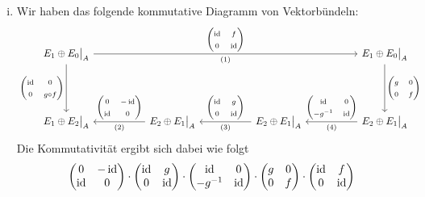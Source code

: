 \begin{beweis}
\mbox{ }
\begin{enumerate}[(i)]
	\item Wir haben das folgende kommutative Diagramm von Vektorbündeln:
	\[
		\begin{tikzcd}[ampersand replacement=\&,row sep=4.8em,column sep=5.2em]
			E_1 \oplus E_0\big|_A \ar[rrr,"{\begin{pmatrix} \id & f \\ 0 & \id \end{pmatrix}}","\text{(1)}"'] \ar[d,"{\begin{pmatrix} \id & 0 \\ 0 & g \circ f \end{pmatrix}}"'] 
			\& \& \& E_1 \oplus E_0\big|_A \ar[d,"{\begin{pmatrix} g & 0 \\ 0 & f \end{pmatrix}}"] \\
			E_1 \oplus E_2\big|_A \& E_2 \oplus E_1\big|_A \lar["{\begin{pmatrix} 0 & -\id \\ \id & 0 \end{pmatrix}}"',"\text{(2)}"]
			\& E_2 \oplus E_1\big|_A \lar["{\begin{pmatrix} \id & g \\ 0 & \id \end{pmatrix}}"',"\text{(3)}"]
			\& E_2 \oplus E_1\big|_A \lar["{\begin{pmatrix} \id & 0 \\ - g^{-1} & \id \end{pmatrix}}"',"\text{(4)}"]
		\end{tikzcd}
	\]
	Die Kommutativität ergibt sich dabei wie folgt
	\begin{align*}
		&\begin{pmatrix} 0 & -\id \\ \id & 0 \end{pmatrix} \cdot 
		\begin{pmatrix} \id & g \\ 0 & \id \end{pmatrix} \cdot 
		\begin{pmatrix} \id & 0 \\ - g^{-1} & \id \end{pmatrix} \cdot 
		\begin{pmatrix} g & 0 \\ 0 & f \end{pmatrix} \cdot 
		\begin{pmatrix} \id & f \\ 0 & \id \end{pmatrix} \\

\end{align*}
\end{enumerate}
\end{beweis}

